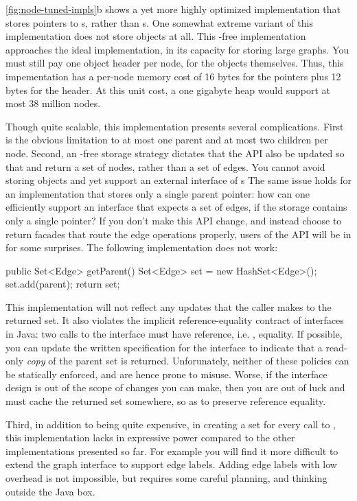 \autoref{fig:node-tuned-impls}b shows a yet more highly optimized 
implementation that stores pointers to s, rather than s.
One somewhat extreme variant of this implementation does not store 
objects at all. This -free implementation approaches the ideal
implementation, in its capacity for storing large graphs. You must still pay one
object header per node, for the  objects themselves. Thus, this
impementation has a per-node memory cost of 16 bytes for the pointers plus 12
bytes for the header. At this unit cost, a one gigabyte heap would support at
most 38 million nodes.

Though quite scalable, this implementation presents several complications. First
is the obvious limitation to at most one parent and at most two children per
node. Second, an -free storage strategy dictates that the
 API also be updated so that  and
 return a set of nodes, rather than a set of edges. You
cannot avoid storing  objects and yet support an external interface
of s The same issue holds for an implementation that stores only a
single parent pointer: how can one efficiently support an interface that expects
a set of edges, if the storage contains only a single pointer? If you don't make
this API change, and instead choose to return facades that route the edge
operations properly, users of the API will be in for some surprises. The
following implementation does not work:
\begin{shortlisting}
public Set<Edge> getParent() {
   Set<Edge> set = new HashSet<Edge>();
   set.add(parent);
   return set;
}
\end{shortlisting}
This implementation will not reflect any updates that the caller makes to the
returned set. It also violates the implicit reference-equality contract of
interfaces in Java: two calls to the  interface must have
reference, i.e. \code{==}, equality. If possible, you can update
the written specification for the interface to indicate that a read-only
\emph{copy} of the parent set is returned. Unforunately, neither of these
policies can be statically enforced, and are hence prone to misuse.
Worse, if the interface design is out of the
scope of changes you can make, then you are out of luck and must cache the
returned set somewhere, so as to preserve reference equality.

Third, in addition to being quite expensive, in creating a set for every call to
, this implementation lacks in expressive power compared to the
other implementations presented so far. For example you will find it more
difficult to extend the graph interface to support edge labels. Adding edge
labels with low overhead is not impossible, but requires some careful planning,
and thinking outside the Java box.

